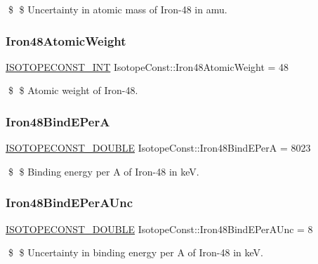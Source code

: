 \$ \$ Uncertainty in atomic mass of Iron-\/48 in amu. \mbox{\label{group___isotope_const-_iron-_fe48_gaede3c9a1f1ce27f55d8a5ef3d7c668a3}} 
\subsubsection{\texorpdfstring{Iron48\+Atomic\+Weight}{Iron48AtomicWeight}}
{\footnotesize\ttfamily \mbox{\hyperlink{group___isotope_const-_macros_ga5f18360b3e99483a35c32d789e62621c}{I\+S\+O\+T\+O\+P\+E\+C\+O\+N\+S\+T\+\_\+\+I\+NT}} Isotope\+Const\+::\+Iron48\+Atomic\+Weight = 48}

\$ \$ Atomic weight of Iron-\/48. \mbox{\label{group___isotope_const-_iron-_fe48_ga3376e3d9886b68160928778772ec2214}} 
\subsubsection{\texorpdfstring{Iron48\+Bind\+E\+PerA}{Iron48BindEPerA}}
{\footnotesize\ttfamily \mbox{\hyperlink{group___isotope_const-_macros_ga8f45a7272ce02c0b4c65c44636ed719a}{I\+S\+O\+T\+O\+P\+E\+C\+O\+N\+S\+T\+\_\+\+D\+O\+U\+B\+LE}} Isotope\+Const\+::\+Iron48\+Bind\+E\+PerA = 8023}

\$ \$ Binding energy per A of Iron-\/48 in keV. \mbox{\label{group___isotope_const-_iron-_fe48_gaba8cf6dc28c55a84049eee31482a8a44}} 
\subsubsection{\texorpdfstring{Iron48\+Bind\+E\+Per\+A\+Unc}{Iron48BindEPerAUnc}}
{\footnotesize\ttfamily \mbox{\hyperlink{group___isotope_const-_macros_ga8f45a7272ce02c0b4c65c44636ed719a}{I\+S\+O\+T\+O\+P\+E\+C\+O\+N\+S\+T\+\_\+\+D\+O\+U\+B\+LE}} Isotope\+Const\+::\+Iron48\+Bind\+E\+Per\+A\+Unc = 8}

\$ \$ Uncertainty in binding energy per A of Iron-\/48 in keV. \mbox{\label{group___isotope_const-_iron-_fe48_ga673973be909b2f1ad27c0e3b98543728}} 
